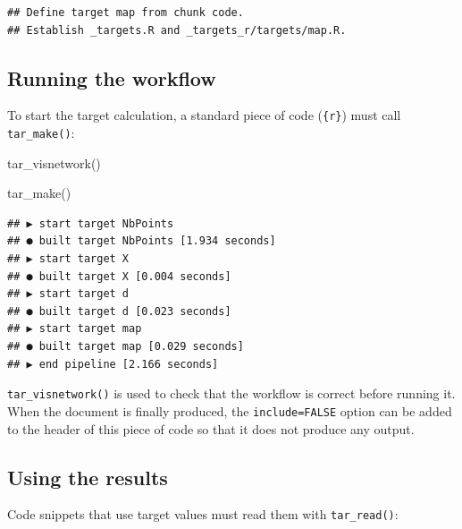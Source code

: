 \documentclass[
  12pt,
  american,
  a4paper,
  extrafontsizes,onecolumn,openright
  ]{memoir}
\newenvironment{Shaded}{\begin{snugshade}}{\end{snugshade}}
\newcommand{\FunctionTok}[1]{\textcolor[rgb]{0.00,0.00,0.00}{#1}}
\newcommand{\NormalTok}[1]{#1}
\begin{document}
\begin{verbatim}
## Define target map from chunk code.
## Establish _targets.R and _targets_r/targets/map.R.
\end{verbatim}

\normalsize

\hypertarget{running-the-workflow}{%
\subsection{Running the workflow}\label{running-the-workflow}}

To start the target calculation, a standard piece of code (\texttt{\{r\}}) must call \texttt{tar\_make()}:

\scriptsize

\begin{Shaded}
\begin{Highlighting}[]
\FunctionTok{tar\_visnetwork}\NormalTok{()}
\end{Highlighting}
\end{Shaded}

\begin{Shaded}
\begin{Highlighting}[]
\FunctionTok{tar\_make}\NormalTok{()}
\end{Highlighting}
\end{Shaded}

\begin{verbatim}
## ▶ start target NbPoints
## ● built target NbPoints [1.934 seconds]
## ▶ start target X
## ● built target X [0.004 seconds]
## ▶ start target d
## ● built target d [0.023 seconds]
## ▶ start target map
## ● built target map [0.029 seconds]
## ▶ end pipeline [2.166 seconds]
\end{verbatim}

\normalsize

\texttt{tar\_visnetwork()} is used to check that the workflow is correct before running it.
When the document is finally produced, the \texttt{include=FALSE} option can be added to the header of this piece of code so that it does not produce any output.

\hypertarget{using-the-results}{%
\subsection{Using the results}\label{using-the-results}}

Code snippets that use target values must read them with \texttt{tar\_read()}:
\end{document}
